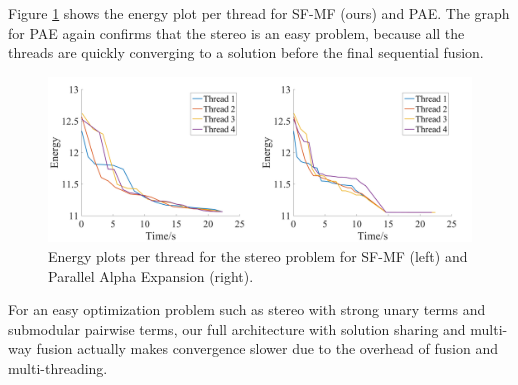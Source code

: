 %
%
%
Figure \ref{fig:stereo_threads} shows the energy plot per thread
for SF-MF (ours) and PAE. The graph for PAE again confirms that the
stereo is an easy problem, because all the threads are quickly
converging to a solution before the final sequential fusion.
\begin{figure}[tb]
  \includegraphics[width=\columnwidth]{figure/stereo_threads.png}
  \caption{
 Energy plots per thread for the stereo problem for SF-MF (left) and
 Parallel Alpha Expansion (right).
} \label{fig:stereo_threads}
\end{figure}

For an easy optimization problem such as stereo with strong unary terms
and submodular pairwise terms, our full architecture with solution
sharing and multi-way fusion actually makes convergence slower due to the
overhead of fusion and multi-threading.









